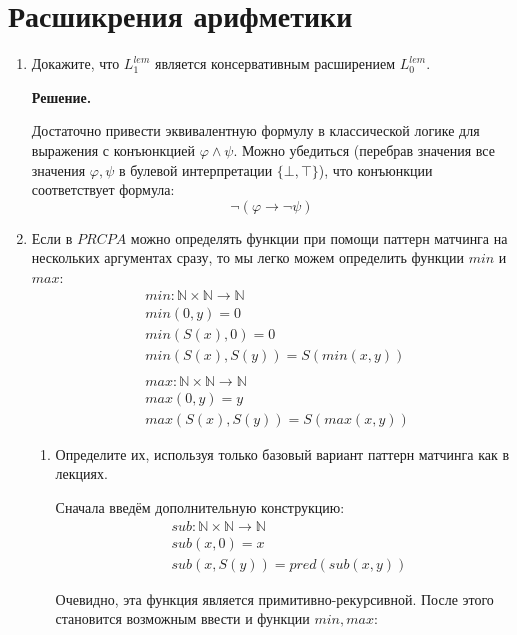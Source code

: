 \section*{Расшикрения арифметики}

\begin{enumerate}

\item Докажите, что $L_1^{lem}$ является консервативным расширением $L_0^{lem}$.

\textbf{Решение.} 

Достаточно привести эквивалентную формулу в классической логике для выражения с конъюнкцией $\varphi \land \psi$. 
Можно убедиться (перебрав значения все значения $\varphi, \psi$ в булевой интерпретации $\{\bot,\top\}$), что конъюнкции соответствует формула:
\begin{equation*}
	\neg(\varphi \to \neg \psi)
\end{equation*}

\item Если в $PRCPA$ можно определять функции при помощи паттерн матчинга на нескольких аргументах сразу, то мы 
легко можем определить функции $min$ и $max$:
\begin{align*}
& min : \mathbb{N} \times \mathbb{N} \to \mathbb{N} \\
& min(0,y) = 0 \\
& min(S(x),0) = 0 \\
& min(S(x),S(y)) = S(min(x,y)) \\
& \\
& max : \mathbb{N} \times \mathbb{N} \to \mathbb{N} \\
& max(0,y) = y \\
& max(S(x),S(y)) = S(max(x,y))
\end{align*}
\begin{enumerate}
\item Определите их, используя только базовый вариант паттерн матчинга как в лекциях.

Сначала введём дополнительную конструкцию:
\begin{align*}
& sub : \mathbb{N} \times \mathbb{N} \to \mathbb{N} \\
& sub (x, 0) = x \\
& sub (x, S(y)) = pred (sub(x, y))
\end{align*}

Очевидно, эта функция является примитивно-рекурсивной. После этого становится возможным ввести и функции 
$min, max$:


\end{enumerate}
\end{enumerate}
